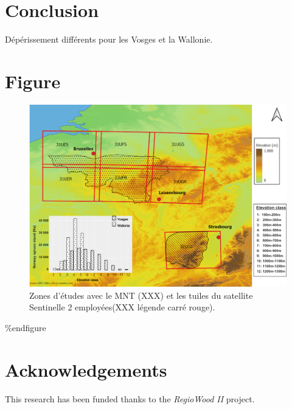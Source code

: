 \documentclass[3p,times]{elsarticle}
\begin{document}
\section{Conclusion}

Dépérissement différents pour les Vosges et la Wallonie.

\section{Figure}

\begin{figure} [htbp] 
	\centering
	\includegraphics[width=1\textwidth]{waql.png}
	\caption{Zones d'études avec le MNT (XXX) et les tuiles du satellite Sentinelle 2 employées(XXX légende carré rouge).}
	\label{fig:situ}
\end{figure}





	

\%end{figure}

\section{Acknowledgements}

This research has been funded thanks to the \textit{RegioWood II} project.



\end{document}
